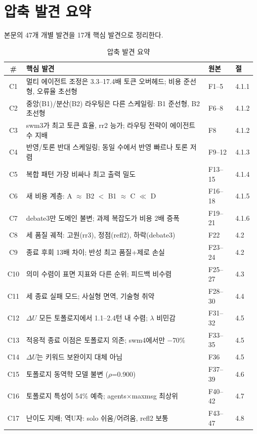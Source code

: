 \section{압축 발견 요약}
\label{app:compressed}

본문의 47개 개별 발견을 17개 핵심 발견으로 정리한다.

\begin{table}[H]
\centering
\caption{압축 발견 요약}
\label{tab:compressed-findings}
{\footnotesize
\begin{tabular}{clll}
\toprule
\# & 핵심 발견 & 원본 & 절 \\
\midrule
C1  & 멀티 에이전트 조정은 3.3--17.4배 토큰 오버헤드; 비용 준선형, 오류율 초선형 & F1--5 & 4.1.1 \\
C2  & 중앙(B1)/분산(B2) 라우팅은 다른 스케일링: B1 준선형, B2 초선형 & F6--8 & 4.1.2 \\
C3  & swm3가 최고 토큰 효율, rr2 능가; 라우팅 전략이 에이전트 수 지배 & F8 & 4.1.2 \\
C4  & 반영/토론 반대 스케일링; 동일 수에서 반영 빠르나 토론 저렴 & F9--12 & 4.1.3 \\
C5  & 복합 패턴 가장 비싸나 최고 출력 밀도 & F13--15 & 4.1.4 \\
C6  & 새 비용 계층: A $\approx$ B2 $<$ B1 $\approx$ C $\ll$ D & F16--18 & 4.1.5 \\
C7  & debate3만 도메인 불변; 과제 복잡도가 비용 2배 증폭 & F19--21 & 4.1.6 \\
C8  & 세 품질 궤적: 고원(rr3), 정점(refl2), 하락(debate3) & F22 & 4.2 \\
C9  & 종료 후회 13배 차이; 반성 최고 품질+제로 손실 & F23--24 & 4.2 \\
C10 & 의미 수렴이 표면 지표와 다른 순위; 피드백 비수렴 & F25--27 & 4.3 \\
C11 & 세 종료 실패 모드; 사실형 면역, 기술형 취약 & F28--30 & 4.4 \\
C12 & $\Delta U$ 모든 토폴로지에서 1.1--2.4턴 내 수렴; $\lambda$ 비민감 & F31--32 & 4.5 \\
C13 & 적응적 종료 이점은 토폴로지 의존; swm4에서만 $-$70\% & F33--35 & 4.5 \\
C14 & $\Delta U$는 키워드 보완이지 대체 아님 & F36 & 4.5 \\
C15 & 토폴로지 동역학 모델 불변 ($\rho$=0.900) & F37--39 & 4.6 \\
C16 & 토폴로지 특성이 54\% 예측; agents$\times$maxmsg 최상위 & F40--42 & 4.7 \\
C17 & 난이도 지배; 역U자: solo 쉬움/어려움, refl2 보통 & F43--47 & 4.8 \\
\bottomrule
\end{tabular}
}
\end{table}



